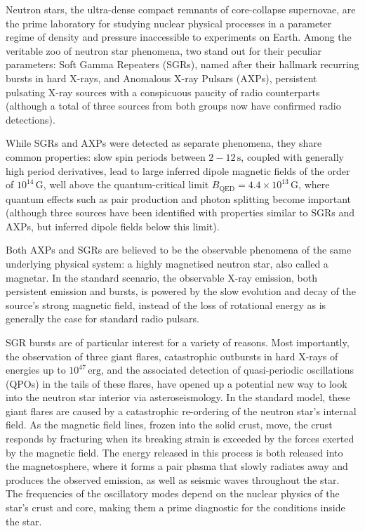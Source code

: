 \documentclass[12pt]{emulateapj}
\begin{document}
Neutron stars, the ultra-dense compact remnants of core-collapse supernovae, are the prime laboratory for studying nuclear 
physical processes in a parameter regime of density and pressure inaccessible to experiments on Earth. 
Among the veritable zoo of neutron star phenomena, two stand out for their peculiar parameters: Soft Gamma Repeaters (SGRs),
named after their hallmark recurring bursts in hard X-rays, and Anomalous X-ray Pulsars (AXPs), persistent pulsating X-ray
sources with a conspicuous paucity of radio counterparts (although a total of three sources from both groups now
have confirmed radio detections). 

While SGRs and AXPs were detected as separate phenomena, they share common properties: slow spin periods between
$2 - 12 \, \mathrm{s}$, coupled with generally high period derivatives, lead to large inferred dipole magnetic fields of
the order of $10^{14} \, \mathrm{G}$, well above the quantum-critical limit $B_{\mathrm{QED}} = 4.4 \times 10^{13} \, \mathrm{G}$,
where quantum effects such as pair production and photon splitting become important (although three sources have been 
identified with properties similar to SGRs and AXPs, but inferred dipole fields below this limit). 

Both AXPs and SGRs are believed to be the observable phenomena of the same underlying physical system: a highly magnetised
neutron star, also called a magnetar. In the standard scenario, the observable X-ray emission, both persistent emission and bursts, 
is powered by the slow evolution and decay of the source's strong magnetic field, instead of the loss of rotational energy as 
is generally the case for standard radio pulsars. 

SGR bursts are of particular interest for a variety of reasons. Most importantly, the observation of three giant flares, catastrophic
outbursts in hard X-rays of energies up to $10^{47} \, \mathrm{erg}$, and the associated detection of quasi-periodic oscillations (QPOs)
in the tails of these flares, have opened up a potential new way to look into the neutron star interior via asteroseismology. In the standard 
model, these giant flares are caused by a catastrophic re-ordering of the neutron star's internal field. As the magnetic field lines, frozen into
the solid crust, move, the crust responds by fracturing when its breaking strain is exceeded by the forces exerted by the magnetic field.
The energy released in this process is both released into the magnetosphere, where it forms a pair plasma that slowly radiates away and
produces the observed emission, as well as seismic waves throughout the star. The frequencies of the oscillatory modes depend on
the nuclear physics of the star's crust and core, making them a prime diagnostic for the conditions inside the star.
\end{document}
